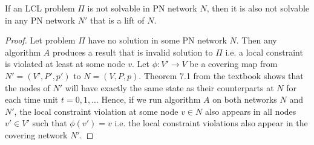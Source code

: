 \begin{lemma} \label{lem:lcl_unsolvability:from_multiple_to_lift}
If an LCL problem $\Pi$ is not solvable in PN network $N$, then it is also not solvable in any PN network $N'$ that is a lift of $N$.
\end{lemma}
\begin{proof}
    Let problem $\Pi$ have no solution in some PN network $N$.
    Then any algorithm $A$ produces a result that is invalid solution to $\Pi$ i.e. a local constraint is violated at least at some node $v$.
    Let $\phi: V' \rightarrow V$ be a covering map from $N'=(V', P', p')$ to $N=(V, P, p)$.
    Theorem 7.1 from the textbook \cite{HirvonenSuomelaDistAlg2020} shows that the nodes of $N'$ will have exactly the same state as their counterparts at $N$ for each time unit $t=0,1,...$
    Hence, if we run algorithm $A$ on both networks $N$ and $N'$, the local constraint violation at some node $v \in N$ also appears in all nodes $v' \in V'$ such that $\phi(v') = v$ i.e. the local constraint violations also appear in the covering network $N'$.
\end{proof}

